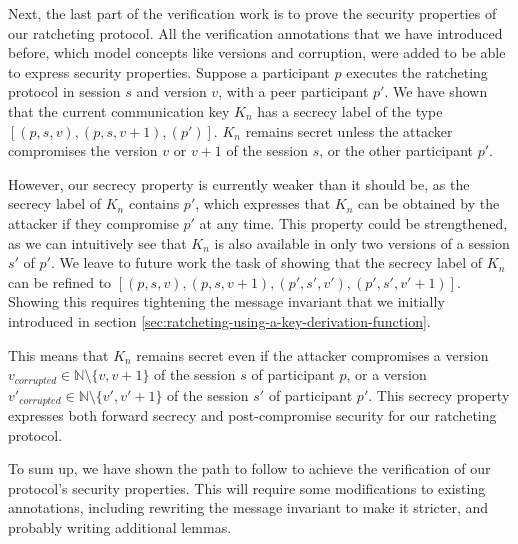 Next, the last part of the verification work is to prove the security properties of our ratcheting protocol.
All the verification annotations that we have introduced before, which model concepts like versions and corruption, were added to be able to express security properties.
Suppose a participant $p$ executes the ratcheting protocol in session $s$ and version $v$, with a peer participant $p'$.
We have shown that the current communication key $K_n$ has a secrecy label of the type $[(p,s,v),(p,s,v+1),(p')]$.
$K_n$ remains secret unless the attacker compromises the version $v$ or $v+1$ of the session $s$, or the other participant $p'$.

However, our secrecy property is currently weaker than it should be, as the secrecy label of $K_n$ contains $p'$, which expresses that $K_n$ can be obtained by the attacker if they compromise $p'$ at any time.
This property could be strengthened, as we can intuitively see that $K_n$ is also available in only two versions of a session $s'$ of $p'$.
We leave to future work the task of showing that the secrecy label of $K_n$ can be refined to $[(p,s,v),(p,s,v+1),(p',s',v'),(p',s',v'+1)]$.
Showing this requires tightening the message invariant that we initially introduced in section \ref{sec:ratcheting-using-a-key-derivation-function}. 

This means that $K_n$ remains secret even if the attacker compromises a version $v_{corrupted} \in \mathbb{N} \setminus \{v, v+1\}$ of the session $s$ of participant $p$, or a version $v'_{corrupted} \in \mathbb{N} \setminus \{v', v'+1\}$ of the session $s'$ of participant $p'$.
This secrecy property expresses both forward secrecy and post-compromise security for our ratcheting protocol.

To sum up, we have shown the path to follow to achieve the verification of our protocol's security properties.
This will require some modifications to existing annotations, including rewriting the message invariant to make it stricter, and probably writing additional lemmas. 

